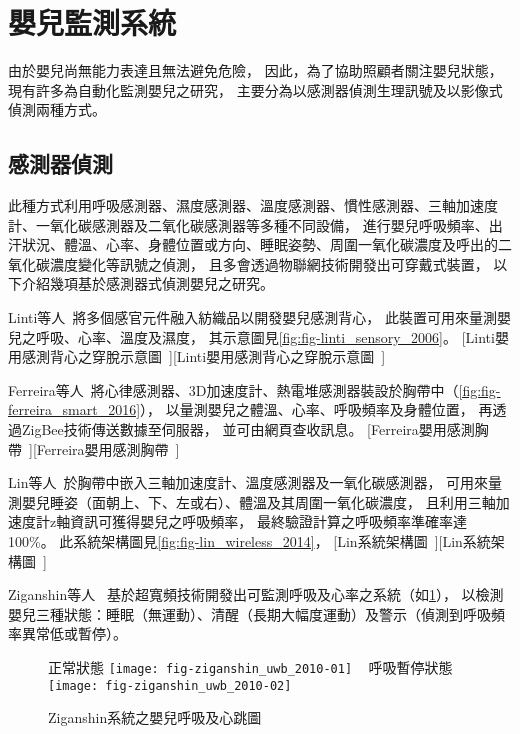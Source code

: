 \documentclass[class=NCU_thesis, crop=false]{standalone}
\begin{document}
\section{嬰兒監測系統}
由於嬰兒尚無能力表達且無法避免危險，
因此，為了協助照顧者關注嬰兒狀態，
現有許多為自動化監測嬰兒之研究，
主要分為以感測器偵測生理訊號及以影像式偵測兩種方式。

\subsection{感測器偵測}
此種方式利用呼吸感測器、濕度感測器、溫度感測器、慣性感測器、三軸加速度計、一氧化碳感測器及二氧化碳感測器等多種不同設備，
進行嬰兒呼吸頻率、出汗狀況、體溫、心率、身體位置或方向、睡眠姿勢、周圍一氧化碳濃度及呼出的二氧化碳濃度變化等訊號之偵測，
且多會透過物聯網技術開發出可穿戴式裝置，
以下介紹幾項基於感測器式偵測嬰兒之研究。

Linti等人~\cite{linti_sensory_2006}將多個感官元件融入紡織品以開發嬰兒感測背心，
此裝置可用來量測嬰兒之呼吸、心率、溫度及濕度，
其示意圖見\cref{fig:fig-linti_sensory_2006}。
[Linti嬰用感測背心之穿脫示意圖~\cite{linti_sensory_2006}][Linti嬰用感測背心之穿脫示意圖~\cite{linti_sensory_2006}]

Ferreira等人~\cite{ferreira_smart_2016}將心律感測器、3D加速度計、熱電堆感測器裝設於胸帶中（\cref{fig:fig-ferreira_smart_2016}），
以量測嬰兒之體溫、心率、呼吸頻率及身體位置，
再透過ZigBee技術傳送數據至伺服器，
並可由網頁查收訊息。
[Ferreira嬰用感測胸帶~\cite{ferreira_smart_2016}][Ferreira嬰用感測胸帶~\cite{ferreira_smart_2016}]

Lin等人~\cite{lin_wireless_2014}於胸帶中嵌入三軸加速度計、溫度感測器及一氧化碳感測器，
可用來量測嬰兒睡姿（面朝上、下、左或右）、體溫及其周圍一氧化碳濃度，
且利用三軸加速度計z軸資訊可獲得嬰兒之呼吸頻率，
最終驗證計算之呼吸頻率準確率達100\%。
此系統架構圖見\cref{fig:fig-lin_wireless_2014}，
[Lin系統架構圖~\cite{lin_wireless_2014}][Lin系統架構圖~\cite{lin_wireless_2014}]

Ziganshin等人~\cite{ziganshin_uwb_2010}
基於超寬頻技術開發出可監測呼吸及心率之系統（如\cref{fig:fig-ziganshin_uwb_2010}），
以檢測嬰兒三種狀態：睡眠（無運動）、清醒（長期大幅度運動）及警示（偵測到呼吸頻率異常低或暫停）。
\begin{figure}[!hbt]
    \centering
    \subcaptionbox
        {正常狀態
        \label{fig:fig-ziganshin_uwb_2010-01}}
        {\texttt{[image: fig-ziganshin\_uwb\_2010-01]}}
    ~
    \subcaptionbox
        {呼吸暫停狀態
        \label{fig:fig-ziganshin_uwb_2010-02}}
        {\texttt{[image: fig-ziganshin\_uwb\_2010-02]}}
    \caption{Ziganshin系統之嬰兒呼吸及心跳圖~\cite{ziganshin_uwb_2010}}
    \label{fig:fig-ziganshin_uwb_2010}
\end{figure}
\end{document}
